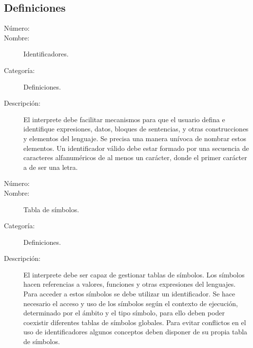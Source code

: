\subsection{Definiciones}

\begin{framed}
	\begin{description}
		\item [Número:] \cn
		\item [Nombre:] Identificadores.
		\item [Categoría:] Definiciones.
		\item [Descripción:]  El interprete debe facilitar mecanismos para que el usuario defina e identifique expresiones, datos, bloques de sentencias, y
		otras construcciones y elementos del lenguaje. Se precisa una manera unívoca de nombrar estos elementos. Un identificador válido debe estar
		formado por una secuencia de caracteres alfanuméricos de al menos un carácter, donde el primer carácter a de ser una letra.
	\end {description}
\end{framed}

\begin{framed}
	\begin{description}
		\item [Número:] \cn
		\item [Nombre:] Tabla de símbolos.
		\item [Categoría:] Definiciones.
		\item [Descripción:] El interprete debe ser capaz de gestionar tablas de símbolos. Los símbolos
		hacen referencias a valores, funciones y otras expresiones del lenguajes. Para acceder a estos símbolos
		se debe utilizar un identificador. Se hace necesario el acceso y uso de los símbolos según el contexto
		de ejecución, determinado por el ámbito y el tipo símbolo, para ello deben poder coexistir diferentes
		tablas de símbolos globales. Para evitar conflictos en el uso de identificadores algunos conceptos 
      deben disponer de su propia tabla de símbolos.
		
	\end {description}
\end{framed}

